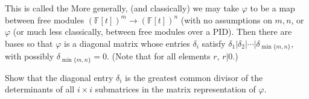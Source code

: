 \documentclass[12pt]{article}
\newcommand{\FF}{{\mathbb F}}
\def\demph#1{{\color{blue}{\sl #1}}}
\begin{document}
    This is called the \demph{Smith normal form of $\varphi$}
    More generally,  (and classically) we may take $\varphi$ to be a map between free modules
    $(\FF[t])^m\to(\FF[t])^n$ (with no assumptions on $m,n$, or $\varphi$ (or much less classically, between free modules over a PID).
    Then there are bases so that $\varphi$ is a diagonal matrix whose entries $\delta_i$ satisfy
     $\delta_1|\delta_2|\dotsb|\delta_{\min\{m,n\}}$, with possibly $\delta_{\min\{m,n\}}=0$.  (Note that for all elements $r$, $r|0$.)


\noindent
    {\color{brown}{\bf Bonus :}}
    Show that the diagonal entry $\delta_i$ is the greatest common divisor of the determinants of all $i\times i$ submatrices in the matrix
    representation of $\varphi$.
\end{document}
